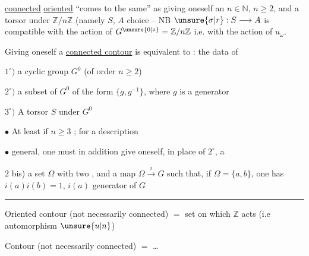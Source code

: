 \uline{connected} \uline{oriented} ``comes to the same'' as giving oneself an $n\in\mathbb{N}$, $n\geq2$, and  a torsor under $\mathbb{Z}/n\mathbb{Z}$ (namely $S$,  $A$  choice -- NB $\unsure{\sigma|r}:S\longrightarrow A$ is compatible with the action of $G^{\unsure{0|\circ}}=\mathbb{Z}/n\mathbb{Z}$ i.e. with the action of $u_{\omega}$.

Giving oneself a \uline{connected contour} is equivalent to : the data of

$1^{\circ})$ a cyclic group $G^{0}$ (of order $n\geq2$)

$2^{\circ})$ a  subset of $G^{0}$  of the form $\{g,g^{-1}\}$, where $g$ is a generator 

$3^{\circ})$ A torsor $S$ under $G^{0}$

$\bullet$ At least if $n\geq3$  ; for a description

$\bullet$ general, one must in addition give oneself, in place of $2^{\circ}$, a

$2$ bis) a set $\Omega$ with two , and a map $\Omega\xrightarrow{i}G$ such that, if $\Omega=\{a,b\}$, one has $i(a)i(b)=1$, $i(a)$ generator of $G$

\begin{center}\rule{1cm}{.35pt}\end{center}

Oriented contour (not necessarily connected) $=$ set on which $\mathbb{Z}$ acts (i.e  automorphism $\unsure{u|n}$)

Contour (not necessarily connected) $=$ \ldots

